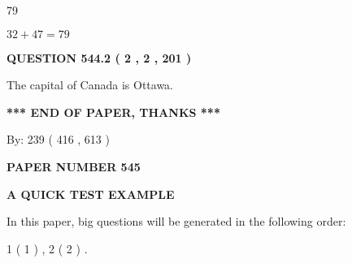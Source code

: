 \documentclass[12pt]{article}
\begin{document}
 
\noindent{}

79
 
 
 
 
\noindent{}

$ %
32 +  %
47=   %
79$
 
 
  
\vspace{0.2in}
  
{\textbf{\Large{QUESTION
544.2 
 ( 2 , 2 , 201 )
}}}
  
  
 
 
\noindent{}
 
 
The capital of Canada is Ottawa.
 
 
 
 
   
   
 \vspace{0.2in}
 
   
   
   
   
\vspace{1.0in} 
{\textbf{\large{ *** END OF PAPER, THANKS *** }}} 
   
   
\hspace{1.0in} By: 
 239 ( 416 ,  613 )
   
   
   
   
\newpage 
\setcounter{page}{ 
   545001 } 
   
   
   
   
 {\textbf{ \Large{ PAPER NUMBER  545  }}}
   
   
\vspace{0.2in}
   
   
   
   
   
   
 \vspace{0.2in}
{\LARGE {\textbf{ A QUICK TEST EXAMPLE}}}
   
   
   
\vspace{0.2in}
   
In this paper, big questions will be generated in the following order: 
   
   
   1 ( 1 )
 ,
   2 ( 2 )
 .
  
\end{document}
